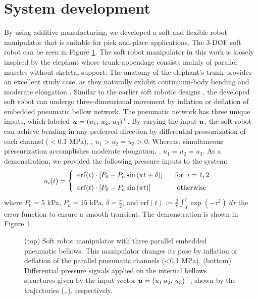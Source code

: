 \section{System development}
By using additive manufacturing, we developed a soft and flexible robot manipulator that is suitable for pick-and-place applications. The 3-DOF soft robot can be seen in Figure \ref{fig:C2:soft_robot}. The soft robot manipulator in this work is loosely inspired by the elephant whose trunk-appendage consists mainly of parallel muscles without skeletal support. The anatomy of the elephant's trunk provides an excellent study case, as they naturally exhibit continuum-body bending and moderate elongation \cite{Falkenhahn2015,Jones2006,Tatlicioglu2007}. Similar to the earlier soft robotic designs
\cite{Suzumori1991,Falkenhahn2015}, the developed soft robot can undergo three-dimensional movement by inflation or deflation of embedded pneumatic bellow network. The pneumatic network has three unique inputs, which labeled ${\boldsymbol{u}} = (u_1,\,u_2,\,u_3)^\top$. By varying the input ${\boldsymbol{u}}$, the soft robot can achieve bending in any preferred direction by differential pressurization of each channel ($<$0.1 \si{\mega \pascal}), \eg, $u_1 > u_2 = u_3 > 0$. Whereas, simultaneous pressurization accomplishes moderate elongation, \ie, $u_1 = u_2 = u_3$. As a demonstration, we provided the following pressure inputs to the system:
%
\begin{align}
  u_i(t) = \begin{cases}
          \;\;\textup{\textrm{erf}}(t)\cdot \left[P_0 - P_a\sin\left(\pi t + \delta\right)\right] \quad\;\; \textrm{for}\;\; i = 1,2 \\[0.35em]
          \;\;\textup{\textrm{erf}}(t)\cdot \left[P_0 - P_a\sin\left(\pi t \right)\right] \quad\quad\quad\;\; \textrm{otherwise}\;\ \\
           \end{cases}
\end{align}
%
where $P_0 = 5$ \si{\kilo \pascal}, $P_a = 15$ \si{\kilo \pascal}, $\delta = \frac{\pi}{2}$, and $\textrm{erf}(t) := \frac{2}{\pi}\int_0^\tau \exp(-\tau^2) \; d\tau$   the error function to ensure a smooth transient. The demonstration is shown in Figure \ref{fig:C2:soft_robot}.

%
\begin{figure}[!h]
 \vspace{-3mm}
  \centering
  \ifx\printFigures\undefined
  \else
  
   \vspace{2mm}
  
  \vspace{-3mm}
  
  \fi
  \caption{(top) Soft robot manipulator with three parallel embedded pneumatic bellows. This manipulator changes its pose by inflation or deflation of the parallel pneumatic channels (<0.1 \si{\mega \pascal}). (bottom) Differential pressure signals applied on the internal bellows structures given by the input vector ${\boldsymbol{u}} = (u_1\,u_2,\,u_3)^\top$, shown by the trajectories (,,), respectively.}
  \vspace{-0.1cm}
  \label{fig:C2:soft_robot}
\end{figure}
%

